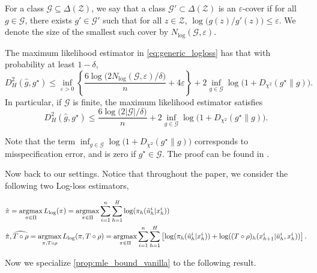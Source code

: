 \documentclass{article}
\begin{document}
\begin{definition}
For a class $\mathcal{G} \subseteq \Delta(\mathcal{Z})$, we say that a class $\mathcal{G}' \subset \Delta(\mathcal{Z})$ is an $\varepsilon$-cover
if for all $g \in \mathcal{G}$, there exists $g' \in \mathcal{G}'$ such that for all $z \in \mathcal{Z}$,
$\log\big(g(z)/g'(z)\big) \le \varepsilon$.
We denote the size of the smallest such cover by $N_{\log}(\mathcal{G},\varepsilon)$.
\end{definition}


\begin{proposition}\label{prop:mle_bound_vanilla}
The maximum likelihood estimator in \cref{eq:generic_logloss} has that with probability at least $1-\delta$,
\[
D_H^2(\hat g, g^\star)
\le
\inf_{\varepsilon>0}
\left\{
\frac{6\log\big(2N_{\log}(\mathcal{G},\varepsilon)/\delta\big)}{n}
+ 4\varepsilon
\right\}
+
2\inf_{g\in\mathcal{G}} \log\big(1 + D_{\chi^2}(g^\star \| g)\big).
\]
In particular, if $\mathcal{G}$ is finite, the maximum likelihood estimator satisfies
\[
D_H^2(\hat g, g^\star)
\le
\frac{6\log\big(2|\mathcal{G}|/\delta\big)}{n}
+
2\inf_{g\in\mathcal{G}} \log\big(1 + D_{\chi^2}(g^\star \| g)\big).
\]
\end{proposition}

\noindent
Note that the term $\inf_{g\in\mathcal{G}}\log\big(1 + D_{\chi^2}(g^\star \| g)\big)$ corresponds to misspecification error,
and is zero if $g^\star \in \mathcal{G}$. The proof can be found in \citet{foster2024behavior}.


Now back to our settings. Notice that throughout the paper, we consider the following two Log-loss estimators,

\begin{equation}\label{eq:sample_loss}
\begin{aligned}
        &\hat \pi=\mathop{\text{argmax}}_{\pi \in \Pi}L_{\textnormal{log}}(\pi)=\mathop{\text{argmax}}_{\pi \in \Pi}\sum_{i=1}^n\sum_{h=1}^H \log(\pi_h(\tilde u_h^i|x_h^i))\\
        &\hat \pi, \widehat{T\circ \rho}=\mathop{\text{argmax}}_{\pi, T\circ \rho}L_{\textnormal{log}}(\pi, T\circ \rho)=\mathop{\text{argmax}}_{\pi \in \Pi}\sum_{i=1}^n\sum_{h=1}^H \left[\log(\pi_h(\tilde u_h^i|x_h^i))+\log((T\circ \rho)_h(x_{h+1}^i|\tilde u_h^i, x_h^i))\right].
\end{aligned}
\end{equation}


Now we specialize \cref{prop:mle_bound_vanilla} to the following result.
\end{document}
